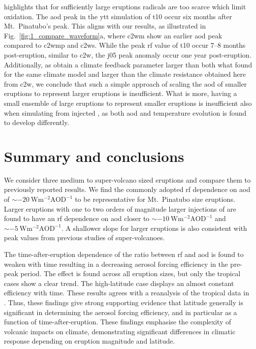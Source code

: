 \documentclass{ametsocV6.1}
\newcommand{\iso}[1][i]{{#1}njected \ce{SO2}}
\begin{document}
\citet{timmreck2010} highlights that for sufficiently large eruptions  radicals
are too scarce which limit  oxidation. The \gls{aod} peak in the \gls{ytt}
simulation of \gls{t10} occur six months after Mt.\ Pinatubo's peak. This aligns with
our results, as illustrated in Fig.~\ref{fig:1_compare_waveform}a, where \gls{c2wm} show
an earlier \gls{aod} peak compared to \gls{c2wmp} and \gls{c2ws}. While the peak
\gls{rf} value of \gls{t10} occur \(7\)--\(8\) months post-eruption, similar to
\gls{c2w}, the \gls{j05} peak anomaly occur one year post-eruption. Additionally, as
\citet{jones2005} obtain a climate feedback parameter larger than both what
\citet{gregory2016} found for the same climate model and larger than the climate
resistance obtained here from \gls{c2w}, we conclude that such a simple approach of
scaling the \gls{aod} of smaller eruptions to represent larger eruptions is
insufficient. What is more, having a small ensemble of large eruptions to represent
smaller eruptions is insufficient also when simulating from \iso{}, as both \gls{aod}
and temperature evolution is found to develop differently.

\section{Summary and conclusions}\label{sec:conclusions}

We consider three medium to super-volcano sized eruptions and compare them to previously
reported results. We find the commonly adopted \gls{rf} dependence on \gls{aod} of
\(\sim\SI{-20}{\watt\metre^{-2}\mathrm{AOD}^{-1}}\) to be representative for Mt.\
Pinatubo size eruptions. Larger eruptions with one to two orders of magnitude larger
injections of \ce{SO2} are found to have an \gls{rf} dependence on \gls{aod} closer to
\(\sim \SI{-10}{\watt\metre^{-2}\mathrm{AOD}^{-1}}\) and \(\sim
\SI{-5}{\watt\metre^{-2}\mathrm{AOD}^{-1}}\). A shallower slope for larger eruptions is
also consistent with peak values from previous studies of super-volcanoes.

The time-after-eruption dependence of the ratio between \gls{rf} and \gls{aod} is found
to weaken with time resulting in a decreasing aerosol forcing efficiency in the pre-peak
period. The effect is found across all eruption sizes, but only the tropical cases show
a clear trend. The high-latitude case displays an almost constant efficiency with time.
These results agrees with a reanalysis of the tropical data in
\citet{marshall2020dataset}. Thus, these findings give strong supporting evidence that
latitude generally is significant in determining the aerosol forcing efficiency, and in
particular as a function of time-after-eruption. These findings emphasise the complexity
of volcanic impacts on climate, demonstrating significant differences in climatic
response depending on eruption magnitude and latitude.
\end{document}
